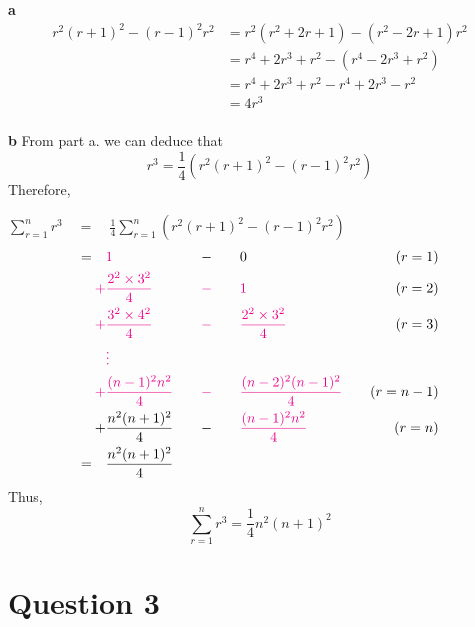 \documentclass[
  a4paper,
]{report}
\begin{document}
\begin{tcolorbox}[enhanced jigsaw, title={Solution}, titlerule=0mm, colbacktitle=quarto-callout-tip-color!10!white, coltitle=black, toprule=.15mm, colframe=quarto-callout-tip-color-frame, breakable, bottomtitle=1mm, toptitle=1mm, arc=.35mm, rightrule=.15mm, bottomrule=.15mm, left=2mm, opacitybacktitle=0.6, leftrule=.75mm, opacityback=0, colback=white]

\textbf{a} \begin{equation*}
\begin{split}
r^2 (r+1)^2-(r-1)^2 r^2 &= r^2 (r^2+2r+1)-(r^2-2r+1)r^2 \\
&= r^4+2r^3+r^2-(r^4-2r^3+r^2) \\
&= r^4+2r^3+r^2-r^4+2r^3-r^2 \\
&= 4r^3 \\
\end{split}
\end{equation*}

\textbf{b} From part a. we can deduce that
\[r^3=\frac{1}{4}(r^2 (r+1)^2-(r-1)^2 r^2)\] Therefore,

\(\sum_{r=1}^{n}r^3  \quad = \quad \frac{1}{4}\sum_{r=1}^{n} \left(r^2 (r+1)^2-(r-1)^2 r^2\right)\)
\begin{alignat*}{3}
= \quad & \textcolor{magenta}{1} &  -  & \qquad  0  & \quad (r=1) \\
\textcolor{magenta}{+}  & \textcolor{magenta}{\frac{2^2 \times 3^2}{4}}  &\textcolor{magenta}{-} &\qquad \textcolor{magenta}{1} & \quad (r=2) \\
\textcolor{magenta}{+} &\textcolor{magenta}{\frac{3^2 \times 4^2}{4}} &\textcolor{magenta}{-} &\qquad  \textcolor{magenta}{\frac{2^2 \times 3^2}{4}} & \quad (r=3) \\
&\textcolor{magenta}{\vdots} & & \quad & \\
\textcolor{magenta}{+}  & \textcolor{magenta}{\frac{(n-1)^2n^2}{4}}  &\textcolor{magenta}{-} & \qquad  \textcolor{magenta}{\frac{(n-2)^2(n-1)^2}{4}}  & \quad (r=n-1)\\
+ & \frac{n^2(n+1)^2}{4} \quad & -  & \qquad \textcolor{magenta}{\frac{(n-1)^2n^2}{4}} & \quad (r=n)\\
= \quad & \frac{n^2(n+1)^2}{4} & & \quad & 
\end{alignat*} Thus, \[\sum_{r=1}^{n}r^3=\frac{1}{4}n^2(n+1)^2\]

\end{tcolorbox}

\section{Question 3}\label{question-3}
\end{document}
